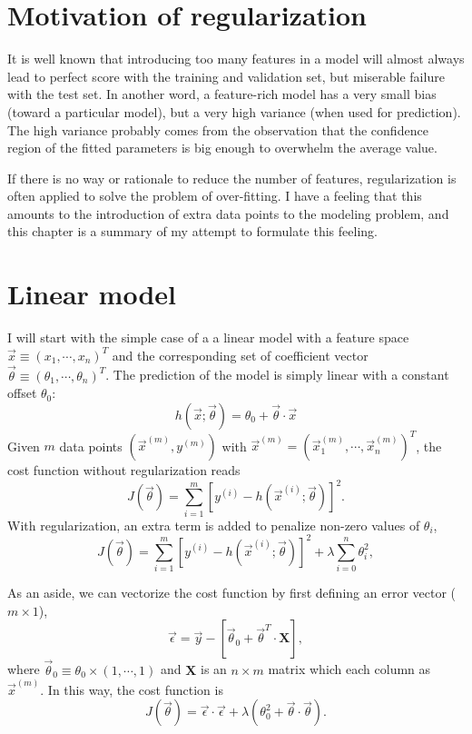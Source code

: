 \section{Motivation of regularization}
It is well known that introducing too many features in a model will almost always lead to perfect score with the training and validation set, 
but miserable failure with the test set. In another word, a feature-rich model has a very small bias (toward a particular model), but a very 
high variance (when used for prediction). The high variance probably comes from the observation that the confidence region of the fitted 
parameters is big enough to overwhelm the average value.

If there is no way or rationale to reduce the number of features, regularization is often applied to solve the problem of over-fitting. 
I have a feeling that this amounts to the introduction of extra data points to the modeling problem, and this chapter is a summary of my 
attempt to formulate this feeling.

\section{Linear model}
I will start with the simple case of a a linear model with a feature space $\vec x \equiv(x_1, \cdots, x_n)^T$ and the corresponding set of coefficient 
vector $\vec\theta\equiv(\theta_1, \cdots, \theta_n)^T$. The prediction of the model is simply linear with a constant offset $\theta_0$:
\begin{equation}
h(\vec x;\vec\theta) = \theta_0 + \vec\theta\cdot\vec x
\end{equation}
Given $m$ data points $(\vec x^{(m)}, y^{(m)})$ with $\vec x^{(m)} = (\vec x_1^{(m)}, \cdots, \vec x_n^{(m)})^T$, the cost function without regularization reads
\begin{equation}
J(\vec\theta) = \sum_{i=1}^{m}\left[y^{(i)}-h(\vec x^{(i)};\vec\theta)\right]^2.
\end{equation}
With regularization, an extra term is added to penalize non-zero values of $\theta_i$,
\begin{equation}
J(\vec\theta) = \sum_{i=1}^{m}\left[y^{(i)}-h(\vec x^{(i)};\vec\theta)\right]^2 + \lambda\sum_{i=0}^{n}\theta_i^2,
\end{equation}

As an aside, we can vectorize the cost function by first defining an error vector ($m\times1$),
\begin{equation}
\vec\epsilon = \vec y - \left[\vec\theta_0+\vec\theta^T\cdot\mathbf{X}\right],
\end{equation}
where $\vec\theta_0\equiv\theta_0\times(1, \cdots, 1)$ and $\mathbf{X}$ is an $n\times m$ matrix which each column as $\vec x^{(m)}$. In this way, the cost function
is
\begin{equation}
J(\vec\theta) = \vec\epsilon\cdot\vec\epsilon + \lambda(\theta_0^2+\vec\theta\cdot\vec\theta).
\end{equation}

